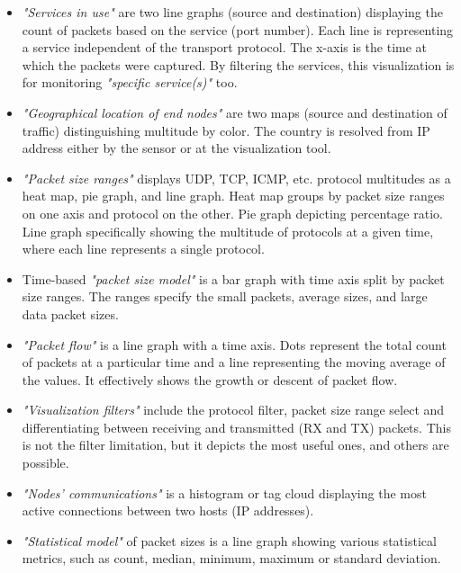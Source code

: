 \documentclass[12pt,a4paper,twoside]{book}
\begin{document}
                \begin{itemize}
                    \item \emph{"Services in use"} are two line graphs (source and destination) displaying the count of packets based on the service (port number). Each line is representing a service independent of the transport protocol. The x-axis is the time at which the packets were captured. By filtering the services, this visualization is for monitoring \emph{"specific service(s)"} too.
                    \item \emph{"Geographical location of end nodes"} are two maps (source and destination of traffic) distinguishing multitude by color. The country is resolved from IP address either by the sensor or at the visualization tool.
                    \item \emph{"Packet size ranges"} displays UDP, TCP, ICMP, etc. protocol multitudes as a heat map, pie graph, and line graph. Heat map groups by packet size ranges on one axis and protocol on the other. Pie graph depicting percentage ratio. Line graph specifically showing the multitude of protocols at a given time, where each line represents a single protocol.
                    \item Time-based \emph{"packet size model"} is a bar graph with time axis split by packet size ranges. The ranges specify the small packets, average sizes, and large data packet sizes.
                    \item \emph{"Packet flow"} is a line graph with a time axis. Dots represent the total count of packets at a particular time and a line representing the moving average of the values. It effectively shows the growth or descent of packet flow.
                    \item \emph{"Visualization filters"} include the protocol filter, packet size range select and differentiating between receiving and transmitted (RX and TX) packets. This is not the filter limitation, but it depicts the most useful ones, and others are possible.
                    \item \emph{"Nodes' communications"} is a histogram or tag cloud displaying the most active connections between two hosts (IP addresses). 
                    \item \emph{"Statistical model"} of packet sizes is a line graph showing various statistical metrics, such as count, median, minimum, maximum or standard deviation.
                \end{itemize}
                
\end{document}

